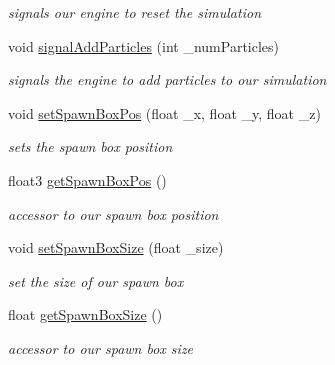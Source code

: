 \begin{DoxyCompactItemize}
\begin{DoxyCompactList}\small\item\em signals our engine to reset the simulation \end{DoxyCompactList}\item 
void \hyperlink{class_s_p_h_engine_a4e61b1f56e20ab4eee7edd111c59912f}{signal\-Add\-Particles} (int \-\_\-num\-Particles)
\begin{DoxyCompactList}\small\item\em signals the engine to add particles to our simulation \end{DoxyCompactList}\item 
void \hyperlink{class_s_p_h_engine_a130606677b2c3edbc9b95006672c1578}{set\-Spawn\-Box\-Pos} (float \-\_\-x, float \-\_\-y, float \-\_\-z)
\begin{DoxyCompactList}\small\item\em sets the spawn box position \end{DoxyCompactList}\item 
float3 \hyperlink{class_s_p_h_engine_a452295b33bfa893db3c9484da9ce9fb5}{get\-Spawn\-Box\-Pos} ()
\begin{DoxyCompactList}\small\item\em accessor to our spawn box position \end{DoxyCompactList}\item 
void \hyperlink{class_s_p_h_engine_a2bf5d2bc9fc8bcc39d42108150123663}{set\-Spawn\-Box\-Size} (float \-\_\-size)
\begin{DoxyCompactList}\small\item\em set the size of our spawn box \end{DoxyCompactList}\item 
float \hyperlink{class_s_p_h_engine_a234554f5b25de8cc34541e1fd0a4b52b}{get\-Spawn\-Box\-Size} ()
\begin{DoxyCompactList}\small\item\em accessor to our spawn box size \end{DoxyCompactList}\end{DoxyCompactItemize}
